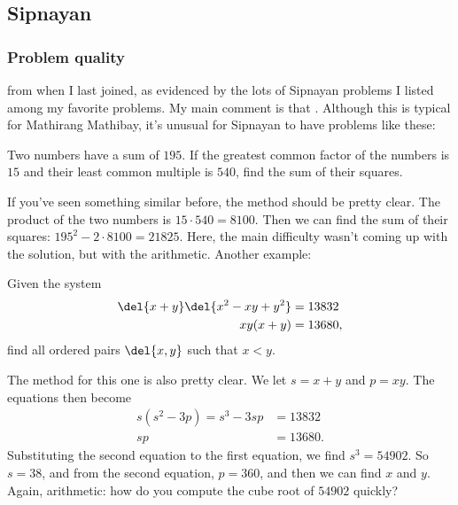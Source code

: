 \documentclass[11pt,paper=letter]{scrartcl}
\begin{document}
\subsection{Sipnayan}

\subsubsection*{Problem quality}

 from when I last joined, as evidenced by the lots of Sipnayan problems I listed among my favorite problems. My main comment is that . Although this is typical for Mathirang Mathibay, it's unusual for Sipnayan to have problems like these:

\begin{probboxed}
   Two numbers have a sum of $195$. If the greatest common factor of the numbers is $15$ and their least common multiple is $540$, find the sum of their squares.
\end{probboxed}

If you've seen something similar before, the method should be pretty clear. The product of the two numbers is $15 \cdot 540 = 8100$. Then we can find the sum of their squares: $195^2 - 2 \cdot 8100 = 21825$. Here, the main difficulty wasn't coming up with the solution, but with the arithmetic. Another example:

\begin{probboxed}
   Given the system \begin{align*}
    \del{x + y}\del{x^2 - xy + y^2} &= 13832 \\
    xy(x + y) &= 13680,
  \end{align*} find all ordered pairs $\del{x ,y}$ such that $x < y$. 
\end{probboxed}

The method for this one is also pretty clear. We let $s = x + y$ and $p = xy$. The equations then become
\begin{align*}
  s(s^2 - 3p) = s^3 - 3sp &= 13832 \\
  sp &= 13680.
\end{align*}
Substituting the second equation to the first equation, we find $s^3 = 54902$. So $s = 38$, and from the second equation, $p = 360$, and then we can find $x$ and $y$. Again, arithmetic: how do you compute the cube root of $54902$ quickly?
\end{document}
